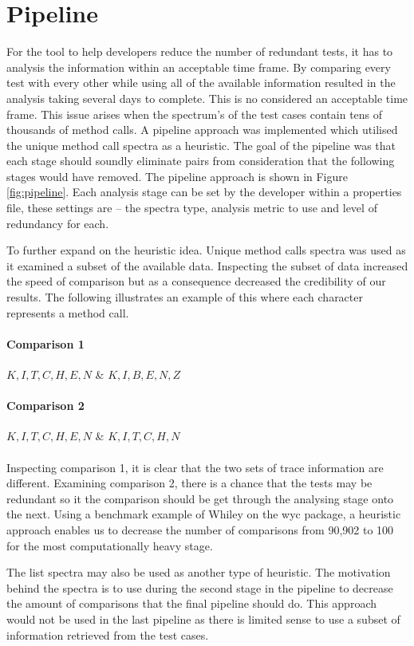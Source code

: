 \section{Pipeline}
For the tool to help developers reduce the number of redundant tests, it has to analysis the information within an acceptable time frame. By comparing every test with every other while using all of the available information resulted in the analysis taking several days to complete. This is no considered an acceptable time frame. This issue arises when the spectrum's of the test cases contain tens of thousands of method calls. A pipeline approach was implemented which utilised the unique method call spectra as a heuristic. The goal of the pipeline was that each stage should soundly eliminate pairs from consideration that the following stages would have removed. The pipeline approach is shown in Figure \ref{fig:pipeline}. Each analysis stage can be set by the developer within a properties file, these settings are -- the spectra type, analysis metric to use and level of redundancy for each.

To further expand on the heuristic idea. Unique method calls spectra was used as it examined a subset of the available data. Inspecting the subset of data increased the speed of comparison but as a consequence decreased the credibility of our results. The following illustrates an example of this where each character represents a method call.
\paragraph{Comparison 1}
$K,I,T,C,H,E,N$ \& $K,I,B,E,N,Z $
\paragraph{Comparison 2}
$K,I,T,C,H,E,N$ \& $K,I,T,C,H,N$
\paragraph{}
Inspecting comparison 1, it is clear that the two sets of trace information are different. Examining comparison 2, there is a chance that the tests may be redundant so it the comparison should be get through the analysing stage onto the next. Using a benchmark example of Whiley on the wyc package, a heuristic approach enables us to decrease the number of comparisons from 90,902 to 100 for the most computationally heavy stage.

The list spectra may also be used as another type of heuristic. The motivation behind the spectra is to use during the second stage in the pipeline to decrease the amount of comparisons that the final pipeline should do. This approach would not be used in the last pipeline as there is limited sense to use a subset of information retrieved from the test cases.

